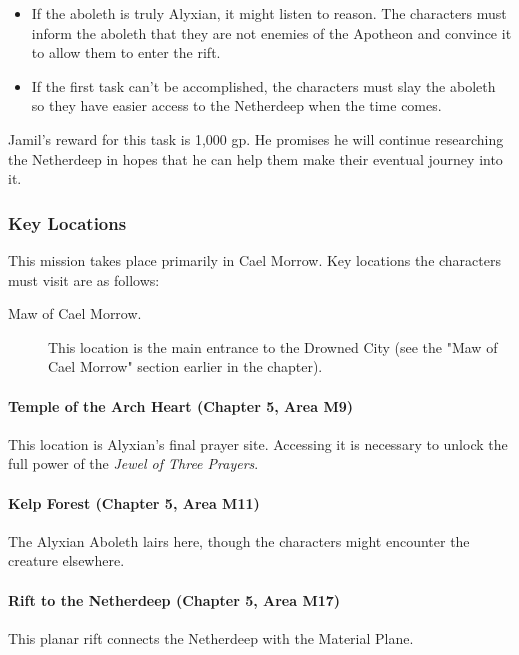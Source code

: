 \documentclass[a4paper, 11pt, bg=full, twocolumn, nooutline]{dndbook}
\begin{document}
\begin{itemize}
\item If the aboleth is truly Alyxian, it might listen to reason. The characters must inform the aboleth that they are not enemies of the Apotheon and convince it to allow them to enter the rift.
\item If the first task can't be accomplished, the characters must slay the aboleth so they have easier access to the Netherdeep when the time comes.
\end{itemize}

Jamil's reward for this task is 1,000 gp. He promises he will continue researching the Netherdeep in hopes that he can help them make their eventual journey into it.

\subsubsection{Key Locations}

This mission takes place primarily in Cael Morrow. Key locations the characters must visit are as follows:

\begin{description}
\item[Maw of Cael Morrow.] This location is the main entrance to the Drowned City (see the "Maw of Cael Morrow" section earlier in the chapter).
\end{description}

\paragraph{Temple of the Arch Heart (Chapter 5, Area M9)}

This location is Alyxian's final prayer site. Accessing it is necessary to unlock the full power of the \textit{Jewel of Three Prayers}.

\paragraph{Kelp Forest (Chapter 5, Area M11)}

The Alyxian Aboleth lairs here, though the characters might encounter the creature elsewhere.

\paragraph{Rift to the Netherdeep (Chapter 5, Area M17)}

This planar rift connects the Netherdeep with the Material Plane.
\end{document}
